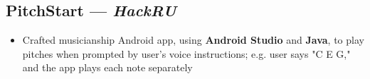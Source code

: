 \documentclass[9pt]{extarticle}
\begin{document}
\begin{minipage}[t]{.7\textwidth}
    \subsection{PitchStart --- \textit{HackRU}}
    \begin{itemize}
        \setlength\itemsep{1dd}
        \item Crafted musicianship Android app, using \textbf{Android Studio} and \textbf{Java}, to play pitches when prompted by user's voice instructions; e.g. user says "C E G," and the app plays each note separately
    \end{itemize}


\end{minipage}
\end{document}
